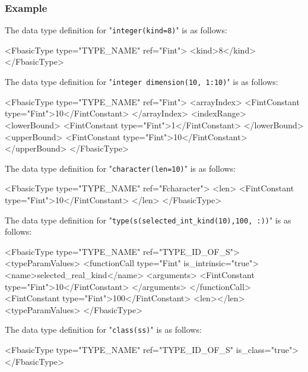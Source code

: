 \subsubsection*{Example}

The data type definition for "{\tt integer(kind=8)}" is as follows:
\vspace{2mm}

\begin{XcodeMLFExample}
<FbasicType type="TYPE_NAME" ref="Fint">
  <kind>8</kind>
</FbasicType>
\end{XcodeMLFExample}

The data type definition for "{\tt integer dimension(10, 1:10)}" is as follows:
\vspace{2mm}

\begin{XcodeMLFExample}
<FbasicType type="TYPE_NAME" ref="Fint">
  <arrayIndex>
    <FintConstant type="Fint">10</FintConstant>
  </arrayIndex>
  <indexRange>
    <lowerBound>
      <FintConstant type="Fint">1</FintConstant>
    </lowerBound>
  <upperBound>
      <FintConstant type="Fint">10</FintConstant>
  </upperBound>
</FbasicType>
\end{XcodeMLFExample}

The data type definition for "{\tt character(len=10)}" is as follows:
\vspace{2mm}

\begin{XcodeMLFExample}
<FbasicType type="TYPE_NAME" ref="Fcharacter">
  <len>
    <FintConstant type="Fint">10</FintConstant>
  </len>
</FbasicType>
\end{XcodeMLFExample}

The data type definition for "{\tt type(s(selected\_int\_kind(10),100, :))}" is as follows:
\vspace{2mm}

\begin{XcodeMLFExample}
<FbasicType type="TYPE_NAME" ref="TYPE_ID_OF_S">
<typeParamValues>
  <functionCall type="Fint" is_intrinsic="true">
    <name>selected_real_kind</name>
  <arguments>
       <FintConstant type="Fint">10</FintConstant>
    </arguments>
  </functionCall>
    <FintConstant type="Fint">100</FintConstant>
	<len></len>
  <typeParamValues>
</FbasicType>
\end{XcodeMLFExample}

The data type definition for "{\tt class(ss)}" is as follows:
\vspace{2mm}

\begin{XcodeMLFExample}
<FbasicType type="TYPE_NAME" ref="TYPE_ID_OF_S" is_class="true">
</FbasicType>
\end{XcodeMLFExample}

